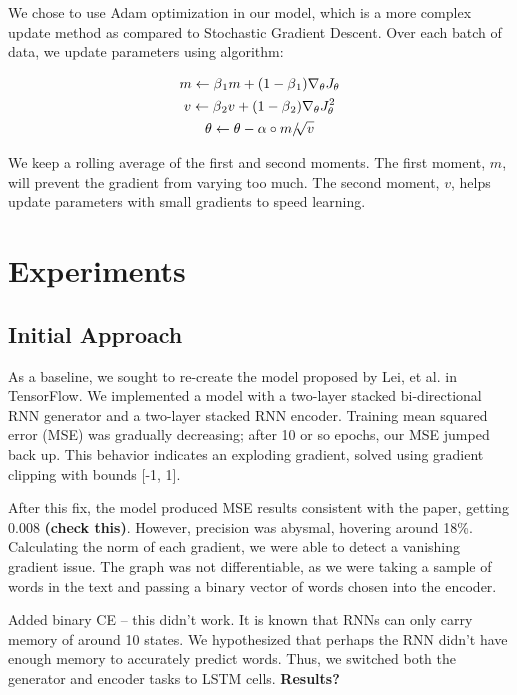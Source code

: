 \documentclass{article} %
\begin{document}
We chose to use Adam optimization in our model, which is a more complex update
method as compared to Stochastic Gradient Descent. Over each batch of data, we
update parameters using algorithm:

\begin{gather}
m \leftarrow \beta \textsubscript{1} m + 
(1 - \beta \textsubscript{1}) \nabla_{\theta} J_\theta \\
v \leftarrow \beta \textsubscript{2} v + 
(1 - \beta \textsubscript{2}) \nabla_{\theta} J_\theta^2\\
\theta \leftarrow \theta - \alpha \circ m / \sqrt[]{v}
\end{gather}

We keep a rolling average of the first and second moments. The first moment,
$m$, will prevent the gradient from varying too much. The second moment, $v$,
helps update parameters with small gradients to speed learning.

\section{Experiments}

\subsection{Initial Approach}

As a baseline, we sought to re-create the model proposed by Lei, et al. in
TensorFlow. We implemented a model with a two-layer stacked bi-directional RNN
generator and a two-layer stacked RNN encoder. Training mean squared error (MSE)
was gradually decreasing; after 10 or so epochs, our MSE jumped back up. This
behavior indicates an exploding gradient, solved using gradient clipping with
bounds [-1, 1].

After this fix, the model produced MSE results consistent with the paper,
getting 0.008 \textbf{(check this)}. However, precision was abysmal, hovering
around 18\%. Calculating the norm of each gradient, we were able to detect a
vanishing gradient issue. The graph was not differentiable, as we were taking a
sample of words in the text and passing a binary vector of words chosen into the
encoder.

Added binary CE -- this didn't work. It is known that RNNs can only carry memory
of around 10 states. We hypothesized that perhaps the RNN didn't have enough
memory to accurately predict words. Thus, we switched both the generator and
encoder tasks to LSTM cells. \textbf{Results?}
\end{document}
